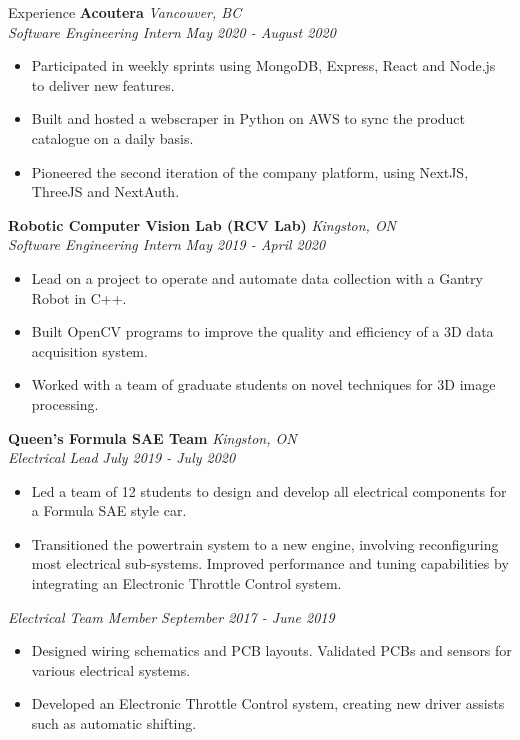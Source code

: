\documentclass{resume}
\begin{document}
\begin{rSection}{Experience}
		{\bf Acoutera} \hfill {\em Vancouver, BC} \\
		{\indent \textit{ Software Engineering Intern} \hfill {\em May 2020 - August 2020}}
		\vspace{-2mm}
		\begin{itemize}
			\setlength{\itemsep}{-8pt}
			\item Participated in weekly sprints using MongoDB, Express, React and Node.js to deliver new features.
			\item Built and hosted a webscraper in Python on AWS to sync the product catalogue on a daily basis.
			\item Pioneered the second iteration of the company platform, using NextJS, ThreeJS and NextAuth. 
		\end{itemize}

		{\bf Robotic Computer Vision Lab (RCV Lab)} \hfill {\em Kingston, ON} \\
		{\indent \textit{ Software Engineering Intern} \hfill {\em May 2019 - April 2020}}
		\vspace{-2mm}
		\begin{itemize}
			\setlength{\itemsep}{-8pt}
			\item Lead on a project to operate and automate data collection with a Gantry Robot in C++.
			\item Built OpenCV programs to improve the quality and efficiency of a 3D data acquisition system.
			\item Worked with a team of graduate students on novel techniques for 3D image processing.
		\end{itemize}

		{\bf Queen's Formula SAE Team} \hfill {\em Kingston, ON} \\
		{\indent \textit{ Electrical Lead} \hfill {\em July 2019 - July 2020}}
		\vspace{-2mm}
		\begin{itemize}
			\setlength{\itemsep}{-8pt}
			\item Led a team of 12 students to design and develop all electrical components for a Formula SAE style car.
			\item Transitioned the powertrain system to a new engine, involving reconfiguring most electrical sub-systems. Improved performance and tuning capabilities by integrating an Electronic Throttle Control system.
		\end{itemize}
		{\indent \textit{ Electrical Team Member} \hfill {\em September 2017 - June 2019}}
		\vspace{-2mm}
		\begin{itemize}
			\setlength{\itemsep}{-8pt}
			\item Designed wiring schematics and PCB layouts. Validated PCBs and sensors for various electrical systems.
			\item Developed an Electronic Throttle Control system, creating new driver assists such as automatic shifting.
		\end{itemize}

	\end{rSection}
\end{document}
